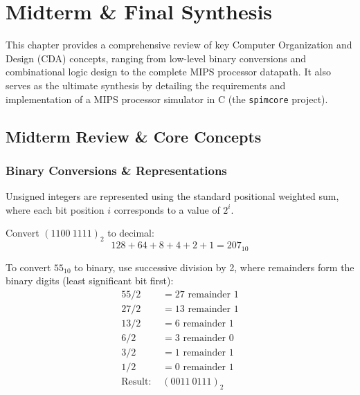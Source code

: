 \chapter{Midterm \& Final Synthesis}

This chapter provides a comprehensive review of key Computer Organization and Design (CDA) concepts, ranging from low-level binary conversions and combinational logic design to the complete MIPS processor datapath. It also serves as the ultimate synthesis by detailing the requirements and implementation of a MIPS processor simulator in C (the \texttt{spimcore} project).

\section{Midterm Review \& Core Concepts}

\subsection{Binary Conversions \& Representations}

\begin{remark}
Unsigned integers are represented using the standard positional weighted sum, where each bit position $i$ corresponds to a value of $2^i$.
\end{remark}

\begin{example}
Convert $(1100\ 1111)_2$ to decimal:
\begin{equation}
128 + 64 + 8 + 4 + 2 + 1 = 207_{10}
\end{equation}
\end{example}

\begin{example}
To convert $55_{10}$ to binary, use successive division by 2, where remainders form the binary digits (least significant bit first):
\begin{align*}
55 / 2 &= 27 \text{ remainder } 1 \\
27 / 2 &= 13 \text{ remainder } 1 \\
13 / 2 &= 6 \text{ remainder } 1 \\
6 / 2 &= 3 \text{ remainder } 0 \\
3 / 2 &= 1 \text{ remainder } 1 \\
1 / 2 &= 0 \text{ remainder } 1 \\
\text{Result: } &(0011\ 0111)_2
\end{align*}
\end{example}

